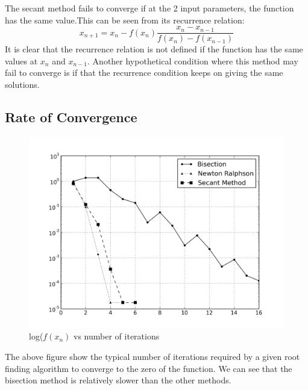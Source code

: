 \documentclass[12,a4paper]{article}
\begin{document}
    The secant method fails to converge if at the 2 input parameters, the function has the same value.This can be seen from its recurrence relation:
    \begin{equation}
         x_{n+1} = x_n - f(x_n)\frac{x_n-x_{n-1}}{f(x_n)-f(x_{n-1})}
    \end{equation}
    It is clear that the recurrence relation is not defined if the function has the same values at $x_n$ and $x_{n-1}$. Another hypothetical condition where this method may fail to converge is if that the recurrence condition keeps on giving the same solutions.
    \subsection{Rate of Convergence}
    \begin{figure}[H]
        \centering
        \includegraphics[width=\textwidth]{plots/root2.png}
        \caption{log($f(x_n)$ vs number of iterations}
        \label{fig:my_label}
    \end{figure}
    The above figure show the typical number of iterations required by a given root finding algorithm to converge to the zero of the function. We can see that the bisection method is relatively slower than the other methods.
    \newpage
\end{document}
